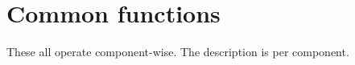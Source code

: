 \hypertarget{group__core__func__common}{\section{\-Common functions}
\label{group__core__func__common}
}
\-These all operate component-\/wise. \-The description is per component. 